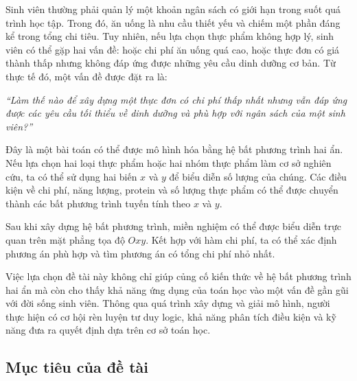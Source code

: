 \documentclass[12pt,a4paper]{article}
\begin{document}
Sinh viên thường phải quản lý một khoản ngân sách có giới hạn trong suốt quá trình học tập. Trong đó, ăn uống là nhu cầu thiết yếu và chiếm một phần đáng kể trong tổng chi tiêu. Tuy nhiên, nếu lựa chọn thực phẩm không hợp lý, sinh viên có thể gặp hai vấn đề: hoặc chi phí ăn uống quá cao, hoặc thực đơn có giá thành thấp nhưng không đáp ứng được những yêu cầu dinh dưỡng cơ bản.
Từ thực tế đó, một vấn đề được đặt ra là:
\begin{center}
\textit{``Làm thế nào để xây dựng một thực đơn có chi phí thấp nhất nhưng vẫn đáp ứng được các yêu cầu tối thiểu về dinh dưỡng và phù hợp với ngân sách của một sinh viên?''}
\end{center}
Đây là một bài toán có thể được mô hình hóa bằng hệ bất phương trình hai ẩn. Nếu lựa chọn hai loại thực phẩm hoặc hai nhóm thực phẩm làm cơ sở nghiên cứu, ta có thể sử dụng hai biến $x$ và $y$ để biểu diễn số lượng của chúng. Các điều kiện về chi phí, năng lượng, protein và số lượng thực phẩm có thể được chuyển thành các bất phương trình tuyến tính theo $x$ và $y$.

Sau khi xây dựng hệ bất phương trình, miền nghiệm có thể được biểu diễn trực quan trên mặt phẳng tọa độ $Oxy$. Kết hợp với hàm chi phí, ta có thể xác định phương án phù hợp và tìm phương án có tổng chi phí nhỏ nhất.

Việc lựa chọn đề tài này không chỉ giúp củng cố kiến thức về hệ bất phương trình hai ẩn mà còn cho thấy khả năng ứng dụng của toán học vào một vấn đề gần gũi với đời sống sinh viên. Thông qua quá trình xây dựng và giải mô hình, người thực hiện có cơ hội rèn luyện tư duy logic, khả năng phân tích điều kiện và kỹ năng đưa ra quyết định dựa trên cơ sở toán học.



\subsection{Mục tiêu của đề tài}
\end{document}
